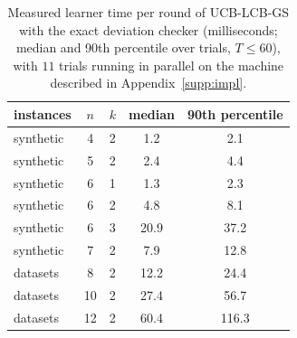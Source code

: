 \begin{table}[h]
\centering\small
\caption{Measured learner time per round of \textsc{UCB-LCB-GS} with the exact deviation checker (milliseconds; median and 90th percentile over trials, $T\le60$), with $11$ trials running in parallel on the machine described in Appendix~\ref{supp:impl}.}
\label{tab:cost}
\begin{tabular}{lcccc}
\toprule
instances & $n$ & $k$ & median & 90th percentile \\
\midrule
synthetic & 4 & 2 & 1.2 & 2.1 \\
synthetic & 5 & 2 & 2.4 & 4.4 \\
synthetic & 6 & 1 & 1.3 & 2.3 \\
synthetic & 6 & 2 & 4.8 & 8.1 \\
synthetic & 6 & 3 & 20.9 & 37.2 \\
synthetic & 7 & 2 & 7.9 & 12.8 \\
datasets & 8 & 2 & 12.2 & 24.4 \\
datasets & 10 & 2 & 27.4 & 56.7 \\
datasets & 12 & 2 & 60.4 & 116.3 \\
\bottomrule
\end{tabular}
\end{table}

